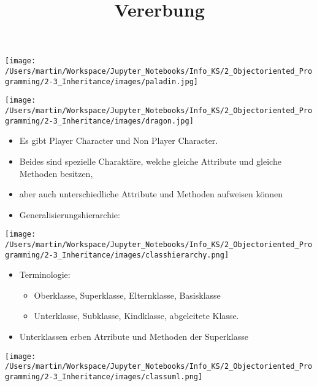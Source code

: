 \documentclass[
  11pt,
  a4paper,
  DIV=11,
  numbers=noendperiod]{scrartcl}
\title{Vererbung}
\author{}
\date{}
\providecommand{\tightlist}{%
  \setlength{\itemsep}{0pt}\setlength{\parskip}{0pt}}\usepackage{longtable,booktabs,array}
\begin{document}
\maketitle

\texttt{[image: /Users/martin/Workspace/Jupyter\_Notebooks/Info\_KS/2\_Objectoriented\_Programming/2-3\_Inheritance/images/paladin.jpg]}

\texttt{[image: /Users/martin/Workspace/Jupyter\_Notebooks/Info\_KS/2\_Objectoriented\_Programming/2-3\_Inheritance/images/dragon.jpg]}

\begin{itemize}
\item
  Es gibt Player Character und Non Player Character.
\item
  Beides sind spezielle Charaktäre, welche gleiche Attribute und gleiche
  Methoden besitzen,
\item
  aber auch unterschiedliche Attribute und Methoden aufweisen können
\item
  Generalisierungshierarchie:
\end{itemize}

\texttt{[image: /Users/martin/Workspace/Jupyter\_Notebooks/Info\_KS/2\_Objectoriented\_Programming/2-3\_Inheritance/images/classhierarchy.png]}

\begin{itemize}
\tightlist
\item
  Terminologie:

  \begin{itemize}
  \tightlist
  \item
    Oberklasse, Superklasse, Elternklasse, Basisklasse
  \item
    Unterklasse, Subklasse, Kindklasse, abgeleitete Klasse.
  \end{itemize}
\item
  Unterklassen erben Atrribute und Methoden der Superklasse
\end{itemize}

\texttt{[image: /Users/martin/Workspace/Jupyter\_Notebooks/Info\_KS/2\_Objectoriented\_Programming/2-3\_Inheritance/images/classuml.png]}
\end{document}
